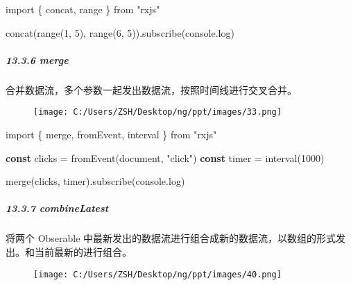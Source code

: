 \documentclass[
]{article}
\newenvironment{Shaded}{}{}
\newcommand{\BuiltInTok}[1]{#1}
\newcommand{\DecValTok}[1]{\textcolor[rgb]{0.25,0.63,0.44}{#1}}
\newcommand{\FunctionTok}[1]{\textcolor[rgb]{0.02,0.16,0.49}{#1}}
\newcommand{\ImportTok}[1]{#1}
\newcommand{\KeywordTok}[1]{\textcolor[rgb]{0.00,0.44,0.13}{\textbf{#1}}}
\newcommand{\NormalTok}[1]{#1}
\newcommand{\OperatorTok}[1]{\textcolor[rgb]{0.40,0.40,0.40}{#1}}
\newcommand{\StringTok}[1]{\textcolor[rgb]{0.25,0.44,0.63}{#1}}
\begin{document}
\begin{Shaded}
\begin{Highlighting}[]
\ImportTok{import}\NormalTok{ \{ concat}\OperatorTok{,}\NormalTok{ range \} }\ImportTok{from} \StringTok{"rxjs"}

\FunctionTok{concat}\NormalTok{(}\FunctionTok{range}\NormalTok{(}\DecValTok{1}\OperatorTok{,} \DecValTok{5}\NormalTok{)}\OperatorTok{,} \FunctionTok{range}\NormalTok{(}\DecValTok{6}\OperatorTok{,} \DecValTok{5}\NormalTok{))}\OperatorTok{.}\FunctionTok{subscribe}\NormalTok{(}\BuiltInTok{console}\OperatorTok{.}\FunctionTok{log}\NormalTok{)}
\end{Highlighting}
\end{Shaded}

\hypertarget{1336-merge}{%
\subparagraph{13.3.6 merge}\label{1336-merge}}

合并数据流，多个参数一起发出数据流，按照时间线进行交叉合并。

\begin{figure}
\centering
\texttt{[image: C:/Users/ZSH/Desktop/ng/ppt/images/33.png]}
\caption{}
\end{figure}

\begin{Shaded}
\begin{Highlighting}[]
\ImportTok{import}\NormalTok{ \{ merge}\OperatorTok{,}\NormalTok{ fromEvent}\OperatorTok{,}\NormalTok{ interval \} }\ImportTok{from} \StringTok{"rxjs"}

\KeywordTok{const}\NormalTok{ clicks }\OperatorTok{=} \FunctionTok{fromEvent}\NormalTok{(}\BuiltInTok{document}\OperatorTok{,} \StringTok{"click"}\NormalTok{)}
\KeywordTok{const}\NormalTok{ timer }\OperatorTok{=} \FunctionTok{interval}\NormalTok{(}\DecValTok{1000}\NormalTok{)}

\FunctionTok{merge}\NormalTok{(clicks}\OperatorTok{,}\NormalTok{ timer)}\OperatorTok{.}\FunctionTok{subscribe}\NormalTok{(}\BuiltInTok{console}\OperatorTok{.}\FunctionTok{log}\NormalTok{)}
\end{Highlighting}
\end{Shaded}

\hypertarget{1337-combinelatest}{%
\subparagraph{13.3.7 combineLatest}\label{1337-combinelatest}}

将两个 Obserable
中最新发出的数据流进行组合成新的数据流，以数组的形式发出。和当前最新的进行组合。

\begin{figure}
\centering
\texttt{[image: C:/Users/ZSH/Desktop/ng/ppt/images/40.png]}
\caption{}
\end{figure}
\end{document}

